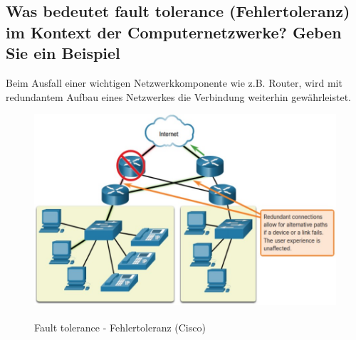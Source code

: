 \subsection*{Was bedeutet \flqq fault tolerance\frqq{} (Fehlertoleranz) im Kontext der Computernetzwerke? Geben Sie ein Beispiel}
Beim Ausfall einer wichtigen Netzwerkkomponente wie z.B. Router, wird mit redundantem Aufbau eines Netzwerkes die Verbindung weiterhin gewährleistet.
\begin{figure}[H]
    \begin{center}
    \label{pic:fault_tolerance}
    \includegraphics[width=\textwidth]{images/fault_tolerance.jpg}
    \caption{Fault tolerance - Fehlertoleranz (\textsuperscript{\textcopyright}Cisco)}
    \end{center}
\end{figure}

\pagebreak

